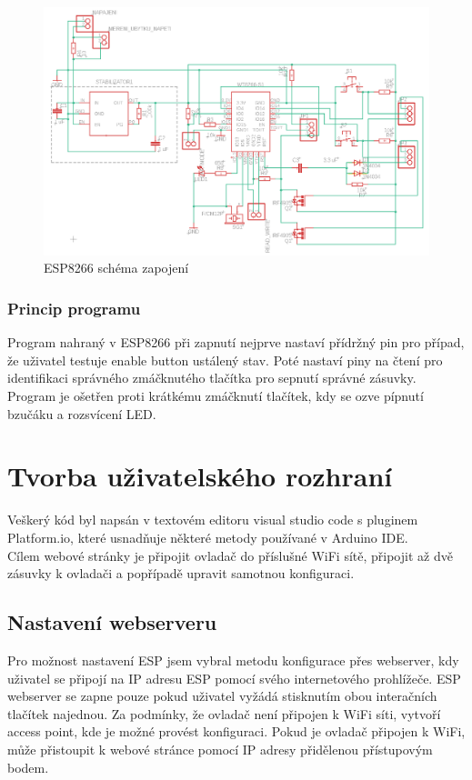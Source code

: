 \documentclass[a4paper, 12pt]{report}
\begin{document}
    \begin{figure}[h]
        \centering
        \includegraphics[width=12cm]{images/esp8266_schema}
        \caption{ESP8266 schéma zapojení}
        \label{fig:ESP8266_DPS}
    \end{figure}
    \subsubsection{Princip programu}
    Program nahraný v ESP8266 při zapnutí nejprve nastaví přídržný pin pro případ, že uživatel testuje enable button ustálený stav. Poté nastaví piny na čtení pro identifikaci správného zmáčknutého tlačítka pro sepnutí správné zásuvky. Program je ošetřen proti krátkému zmáčknutí tlačítek, kdy se ozve pípnutí bzučáku a rozsvícení LED.

    \section{Tvorba uživatelského rozhraní}
    Veškerý kód byl napsán v textovém editoru visual studio code s pluginem Platform.io, které usnadňuje některé metody používané v Arduino IDE.\\
    Cílem webové stránky je připojit ovladač do příslušné WiFi sítě, připojit až dvě zásuvky k ovladači a popřípadě upravit samotnou konfiguraci.

    \subsection{Nastavení webserveru}
    Pro možnost nastavení ESP jsem vybral metodu konfigurace přes webserver, kdy uživatel se připojí na IP adresu ESP pomocí svého internetového prohlížeče. ESP webserver se zapne pouze pokud uživatel vyžádá stisknutím obou interačních tlačítek najednou. Za podmínky, že ovladač není připojen k WiFi síti, vytvoří access point, kde je možné provést konfiguraci. Pokud je ovladač připojen k WiFi, může přistoupit k webové stránce pomocí IP adresy přidělenou přístupovým bodem.
\end{document}
